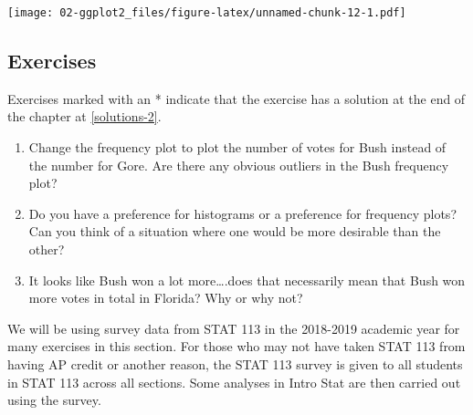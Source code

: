 \documentclass[
]{book}
\begin{document}
\texttt{[image: 02-ggplot2\_files/figure-latex/unnamed-chunk-12-1.pdf]}

\hypertarget{exercise-2-1}{%
\subsection{Exercises}\label{exercise-2-1}}

Exercises marked with an * indicate that the exercise has a solution at the end of the chapter at \ref{solutions-2}.

\begin{enumerate}
\def\labelenumi{\arabic{enumi}.}
\item
  Change the frequency plot to plot the number of votes for Bush instead of the number for Gore. Are there any obvious outliers in the Bush frequency plot?
\item
  Do you have a preference for histograms or a preference for frequency plots? Can you think of a situation where one would be more desirable than the other?
\item
  It looks like Bush won a lot more\ldots.does that necessarily mean that Bush won more votes in total in Florida? Why or why not?
\end{enumerate}

We will be using survey data from STAT 113 in the 2018-2019 academic year for many exercises in this section. For those who may not have taken STAT 113 from having AP credit or another reason, the STAT 113 survey is given to all students in STAT 113 across all sections. Some analyses in Intro Stat are then carried out using the survey.
\end{document}
